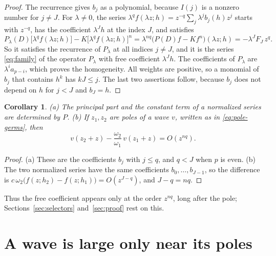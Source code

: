 \documentclass[11pt]{article}
\newtheorem{corollary}[theorem]{Corollary}
\theoremstyle{definition}
\theoremstyle{remark}
\numberwithin{equation}{section}
\begin{document}
\begin{proof}
The recurrence gives \(b_j\) as a polynomial, because \(I(j)\) is a
nonzero number for \(j\ne J\). For \(\lambda\ne0\), the series
\(\lambda^qf(\lambda z;h)=z^{-q}\sum_j\lambda^jb_j(h)z^j\) starts with
\(z^{-q}\), has the coefficient \(\lambda^Jh\) at the index \(J\), and
satisfies
\[
 P_\lambda(D)\bigl[\lambda^qf(\lambda z;h)\bigr]
 -K\bigl[\lambda^qf(\lambda z;h)\bigr]^n
 =\lambda^{nq}\bigl(P(D)f-Kf^n\bigr)(\lambda z;h)
 =-\lambda^{J}F_J\,z^{q}.
\]
So it satisfies the recurrence of \(P_\lambda\) at all indices
\(j\ne J\), and it is the series \eqref{eq:family} of the operator
\(P_\lambda\) with free coefficient \(\lambda^Jh\). The coefficients of
\(P_\lambda\) are \(\lambda^ia_{p-i}\), which proves the homogeneity.
All weights are positive, so a monomial of \(b_j\) that contains
\(h^k\) has \(kJ\le j\). The last two assertions follow, because
\(b_j\) does not depend on \(h\) for \(j<J\) and \(b_J=h\).
\end{proof}

\begin{corollary}\label{cor:local}
\textup{(a)} The principal part and the constant term of a normalized
series are determined by \(P\).
\textup{(b)} If \(z_1,z_2\) are poles of a wave \(v\), written as in
\eqref{eq:pole-germs}, then
\[
 v(z_2+z)-\frac{\omega_2}{\omega_1}\,v(z_1+z)=O(z^{nq}).
\]
\end{corollary}

\begin{proof}
(a) These are the coefficients \(b_j\) with \(j\le q\), and \(q<J\)
when \(p\) is even. (b) The two
normalized series have the same coefficients \(b_0,\dots,b_{J-1}\), so
the difference is \(c\,\omega_2\bigl(f(z;h_2)-f(z;h_1)\bigr)
=O(z^{J-q})\), and \(J-q=nq\).
\end{proof}

Thus the free coefficient appears only at the order \(z^{nq}\), long
after the pole; Sections~\ref{sec:selectors} and~\ref{sec:proof} rest
on this.

\section{A wave is large only near its poles}\label{sec:analytic}
\end{document}
